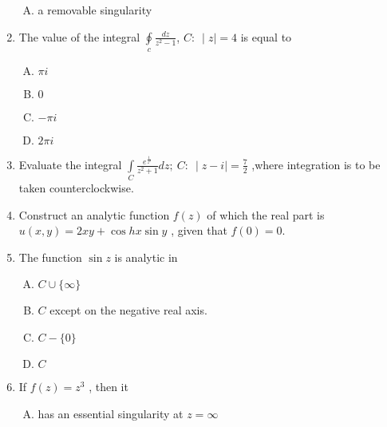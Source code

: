 \documentclass[12pt,a4paper]{article}
\begin{document}
\begin{enumerate}
\begin{enumerate}[(A)]
\item 
a removable singularity

\end{enumerate}

\item The value of the integral $ \oint\limits_{c} \frac{dz}{z^2-1}$, $ C :\ \mid z \mid =4$ is equal to

\begin{enumerate}[(A)]

\item $
\pi i
$

\item $
0
$

\item $
- \pi i
$

\item $
2 \pi i
$

\end{enumerate}

\item Evaluate the integral $\int\limits_{C}\frac{e^{\frac{1}{z^2}}}{z^2+1} dz ;\ C : \ \mid z-i \mid = \frac{7}{2} $ ,where integration is to be taken counterclockwise.

\item Construct an analytic function $f(z)$ of which the real part is
$u(x,y)=2xy+ \cos hx \sin y $ , given that $f(0)=0$.

\item The function $ \sin z$ is analytic in

\begin{enumerate}[(A)]

\item $
C \cup \lbrace \infty \rbrace
$

\item 
$C$ except on the negative real axis.

\item $
C-\lbrace 0 \rbrace
$

\item $
C
$

\end{enumerate}
                                                                                                                                                                        
\item If $f(z)=z^3$ , then it

\begin{enumerate}[(A)]

\item 
has an essential singularity at $z=\infty$


\end{enumerate}
\end{enumerate}
\end{document}
